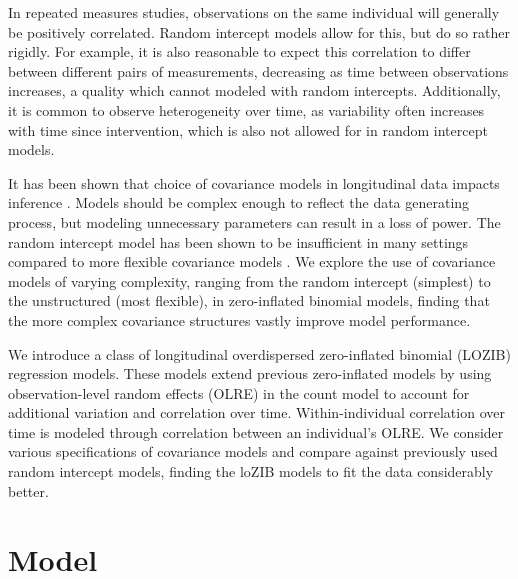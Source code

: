 \documentclass[12pt]{article}
\begin{document}
In repeated measures studies, observations on the same individual will generally be positively correlated. Random intercept models allow for this, but do so rather rigidly. For example, it is also reasonable to expect this correlation to differ between different pairs of measurements, decreasing as time between observations increases, a quality which cannot modeled with random intercepts. Additionally, it is common to observe heterogeneity over time, as variability often increases with time since intervention, which is also not allowed for in random intercept models.

It has been shown that choice of covariance models in longitudinal data impacts inference \citep{lange1989effect, wolfinger1996heterogeneous}. Models should be complex enough to reflect the data generating process, but modeling unnecessary parameters can result in a loss of power. The random intercept model has been shown to be insufficient in many settings compared to more flexible covariance models \citep{barr2013random, kwok2007impact}.  We explore the use of covariance models of varying complexity, ranging from the random intercept (simplest) to the unstructured (most flexible), in zero-inflated binomial models, finding that the more complex covariance structures vastly improve model performance.

We introduce a class of longitudinal overdispersed zero-inflated binomial (LOZIB) regression models. These models extend previous zero-inflated models by using observation-level random effects (OLRE) in the count model to account for additional variation and correlation over time.  Within-individual correlation over time is modeled through correlation between an individual's OLRE. We consider various specifications of covariance models and compare against previously used random intercept models, finding the loZIB models to fit the data considerably better.

\section{Model}
\label{s:model}
\end{document}
